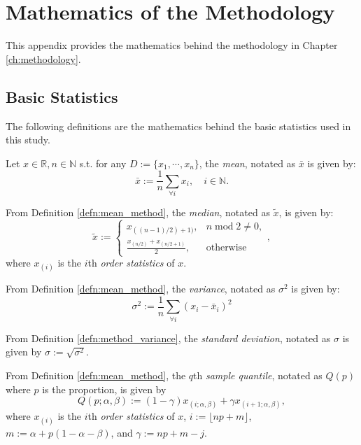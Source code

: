 \chapter{Mathematics of the Methodology}\label{app:math_methodology}
This appendix provides the mathematics behind the methodology in Chapter \ref{ch:methodology}. 

\section{Basic Statistics}
The following definitions are the mathematics behind the basic statistics used in this study.

\begin{defn}[Mean]\label{defn:mean_method}
    Let $x\in\mathbb{R}, n\in\mathbb{N}$ s.t. for any $D:=\{x_1,\cdots,x_n\}$, the \textit{mean}, notated as $\bar{x}$ is given by:
    \begin{equation}
        \bar{x}:=\frac{1}{n}\sum_{\forall i}x_i,\quad i\in\mathbb{N}.
    \end{equation}
\end{defn}
\begin{defn}[Median]
    From Definition \ref{defn:mean_method}, the \textit{median}, notated as $\tilde{x}$, is given by:
    \begin{equation}
        \tilde{x}:=\begin{cases}
            x_{((n-1)/2)+1)},& n\operatorname{mod}2 \neq 0,\\[0.3cm]
            \displaystyle\frac{x_{(n/2)}+x_{(n/2+1)}}{2},&\text{otherwise}
        \end{cases},
    \end{equation}  
    where $x_{(i)}$ is the $i$th \textit{order statistics} of $x$.
\end{defn}
\begin{defn}[Variance]\label{defn:method_variance}
    From Definition \ref{defn:mean_method}, the \textit{variance}, notated as $\sigma^2$ is given by:
    \begin{equation}
        \sigma^2:=\frac{1}{n}\sum_{\forall i}(x_i-\bar{x}_i)^2
    \end{equation}
\end{defn}
\begin{defn}
    From Definition \ref{defn:method_variance}, the \textit{standard deviation}, notated as $\sigma$ is given by $\sigma:=\sqrt{\sigma^2}$.
\end{defn}
\begin{defn}
    From Definition \ref{defn:mean_method}, the $q$th \textit{sample quantile}, notated as $Q(p)$ where $p$ is the proportion, is given by
    \begin{equation}
        Q(p;\alpha,\beta):=(1-\gamma)x_{(i;\alpha,\beta)} + \gamma x_{(i+1;\alpha,\beta)},
    \end{equation}
    where $x_{(i)}$ is the $i$th \textit{order statistics} of $x$, $i:=\lfloor np+m\rfloor$, $m:=\alpha+p(1-\alpha-\beta)$, and $\gamma:=np+m-j$.
\end{defn}
